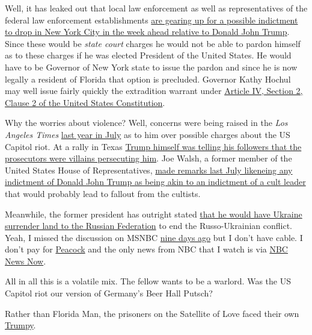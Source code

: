 Well, it has leaked out that local law enforcement as well as
representatives of the federal law enforcement establishments
\href{https://web.archive.org/web/20230318002208/https://www.nbcnews.com/politics/donald-trump/law-enforcement-agencies-are-prepping-possible-trump-indictment-early-rcna75493}{are
gearing up for a possible indictment to drop in New York City in the
week ahead relative to Donald John Trump}. Since these would be
\emph{state court} charges he would not be able to pardon himself as to
these charges if he was elected President of the United States. He would
have to be Governor of New York state to issue the pardon and since he
is now legally a resident of Florida that option is precluded. Governor
Kathy Hochul may well issue fairly quickly the extradition warrant under
\href{https://web.archive.org/web/20230115185005/https://constitution.congress.gov/constitution/article-4/}{Article
IV, Section 2, Clause 2 of the United States Constitution}.

Why the worries about violence? Well, concerns were being raised in the
\emph{Los Angeles Times}
\href{https://web.archive.org/web/20220818231611/https://www.latimes.com/opinion/letters-to-the-editor/story/2022-07-26/trump-charged-jan-6-possible-civil-war}{last
year in July} as to him over possible charges about the US Capitol riot.
At a rally in Texas
\href{https://web.archive.org/web/20230307001022/https://www.huffpost.com/entry/trump-protests-prosecution_n_61f60c9ee4b02de5f51a0c4a}{Trump
himself was telling his followers that the prosecutors were villains
persecuting him}. Joe Walsh, a former member of the United States House
of Representatives,
\href{https://web.archive.org/web/20221230140433/https://www.newsweek.com/joe-walsh-warns-major-violence-if-donald-trump-indicted-january-6-capitol-riots-1725601}{made
remarks last July likeneing any indictment of Donald John Trump as being
akin to an indictment of a cult leader} that would probably lead to
fallout from the cultists.

Meanwhile, the former president has outright stated
\href{https://web.archive.org/web/20230315023902/https://news.yahoo.com/fox-news-edits-trump-saying-210420818.html}{that
he would have Ukraine surrender land to the Russian Federation} to end
the Russo-Ukrainian conflict. Yeah, I missed the discussion on MSNBC
\href{https://archive.org/details/MSNBCW_20230310_030000_The_Last_Word_With_Lawrence_ODonnell/start/2801/end/3248.5}{nine
days ago} but I don't have cable. I don't pay for
\href{https://en.wikipedia.org/wiki/Peacock_(streaming_service)}{Peacock}
and the only news from NBC that I watch is via
\href{https://web.archive.org/web/20230317135428/https://www.nbcnews.com/now}{NBC
News Now}.

All in all this is a volatile mix. The fellow wants to be a warlord. Was
the US Capitol riot our version of Germany's Beer Hall Putsch?

Rather than Florida Man, the prisoners on the Satellite of Love faced
their own \href{https://youtu.be/cW-5qrwsiOI}{Trumpy}.
